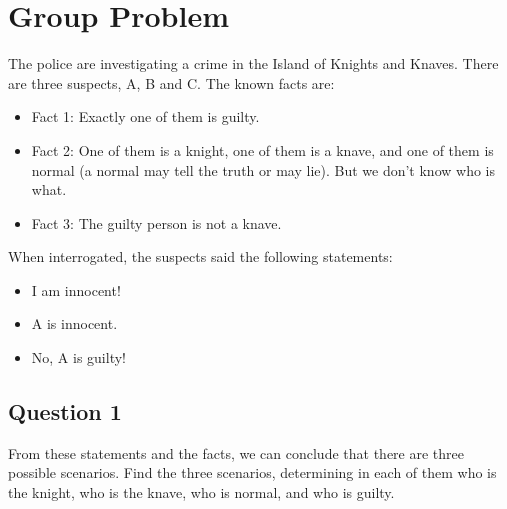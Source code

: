 \documentclass{article}
\begin{document}
\pagebreak
\section{Group Problem}
The police are investigating a crime in the Island of Knights and Knaves. There are three suspects, A, B and C. The known facts are:

\begin{itemize}[noitemsep, nolistsep]
	\item Fact 1: Exactly one of them is guilty.
	\item Fact 2: One of them is a knight, one of them is a knave, and one of them is normal (a normal may tell the truth or may lie). But we don't know who is what.
	\item Fact 3: The guilty person is not a knave.
\end{itemize}

When interrogated, the suspects said the following statements:
\begin{itemize}[noitemsep, nolistsep]
	\item I am innocent!
	\item A is innocent.
	\item No, A is guilty!
\end{itemize}

\subsection{Question 1} 
From these statements and the facts, we can conclude that there are three possible scenarios. Find the three scenarios, determining in each of them who is the knight, who is the knave, who is normal, and who is guilty.
\end{document}
